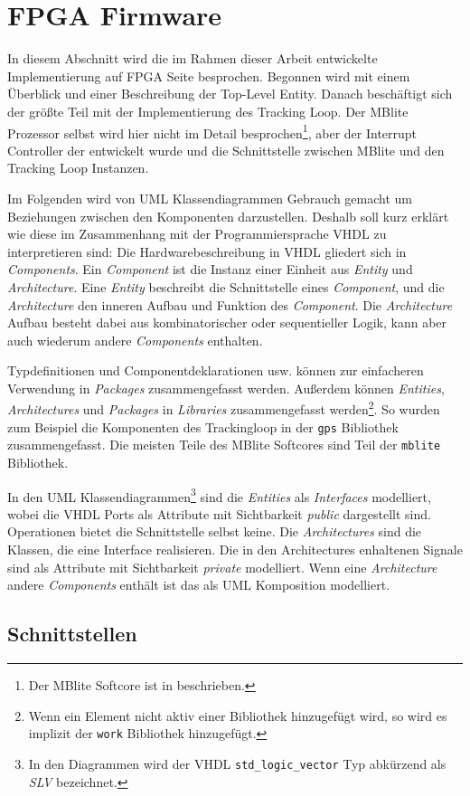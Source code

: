 \section{FPGA Firmware}
In diesem Abschnitt wird die im Rahmen dieser Arbeit entwickelte Implementierung auf FPGA Seite besprochen. Begonnen wird mit einem Überblick und einer Beschreibung der Top-Level Entity. Danach beschäftigt sich der größte Teil mit der Implementierung des Tracking Loop. Der MBlite Prozessor selbst wird hier nicht im Detail besprochen\footnote{Der MBlite Softcore ist in \cite{MBliteThesis} beschrieben.}, aber der Interrupt Controller der entwickelt wurde und die Schnittstelle zwischen MBlite und den Tracking Loop Instanzen.

Im Folgenden wird von UML Klassendiagrammen Gebrauch gemacht um Beziehungen zwischen den Komponenten darzustellen. Deshalb soll kurz erklärt wie diese im Zusammenhang mit der Programmiersprache VHDL zu interpretieren sind: Die Hardwarebeschreibung in VHDL gliedert sich in \emph{Components}. Ein \emph{Component} ist die Instanz einer Einheit aus \emph{Entity} und  \emph{Architecture}. Eine \emph{Entity} beschreibt die Schnittstelle eines \emph{Component}, und die \emph{Architecture} den inneren Aufbau und Funktion des \emph{Component}. Die \emph{Architecture} Aufbau besteht dabei aus kombinatorischer oder sequentieller Logik, kann aber auch wiederum andere \emph{Components} enthalten.

Typdefinitionen und Componentdeklarationen usw. können zur einfacheren Verwendung in \emph{Packages} zusammengefasst werden. Außerdem können \emph{Entities}, \emph{Architectures} und \emph{Packages} in \emph{Libraries} zusammengefasst werden\footnote{Wenn ein Element nicht aktiv einer Bibliothek hinzugefügt wird, so wird es implizit der \lstinline$work$ Bibliothek hinzugefügt.}. So wurden zum Beispiel die Komponenten des Trackingloop in der \lstinline$gps$ Bibliothek zusammengefasst. Die meisten Teile des MBlite Softcores sind Teil der \lstinline$mblite$ Bibliothek.

In den UML Klassendiagrammen\footnote{In den Diagrammen wird der VHDL \lstinline$std_logic_vector$ Typ abkürzend als \emph{SLV} bezeichnet.} sind die \emph{Entities} als  \emph{Interfaces} modelliert, wobei die VHDL Ports als Attribute mit Sichtbarkeit \emph{public} dargestellt sind. Operationen bietet die Schnittstelle selbst keine. Die \emph{Architectures} sind die Klassen, die eine Interface realisieren. Die in den Architectures enhaltenen Signale sind als Attribute mit Sichtbarkeit \emph{private} modelliert. Wenn eine \emph{Architecture} andere \emph{Components} enthält ist das als UML Komposition modelliert.



\subsection{Schnittstellen}





